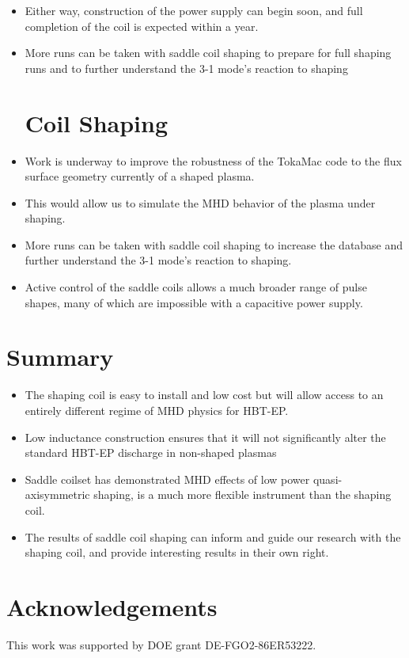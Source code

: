 \documentclass{article}
\begin{document}
\begin{multicols}{5}
\begin{itemize}
\item Either way, construction of the power supply can begin soon, and full completion of the coil is expected within a year.

\item More runs can be taken with saddle coil shaping to prepare for full shaping runs and to further understand the 3-1 mode's reaction to shaping

\section*{Coil Shaping}

\item Work is underway to improve the robustness of the TokaMac code to the flux surface geometry currently of a shaped plasma.  

\item This would allow us to simulate the MHD behavior of the plasma under shaping.

\item More runs can be taken with saddle coil shaping to increase the database and further understand the 3-1 mode's reaction to shaping.

\item Active control of the saddle coils allows a much broader range of pulse shapes, many of which are impossible with a capacitive power supply.  

\end{itemize}


\section{Summary}
\label{sec:summary}

\begin{itemize}
\item The shaping coil is easy to install and low cost but will allow access to an entirely different regime of MHD physics for HBT-EP.  
\item Low inductance construction ensures that it will not significantly alter the standard HBT-EP discharge in non-shaped plasmas
\item Saddle coilset has demonstrated MHD effects of low power quasi-axisymmetric shaping, is a much more flexible instrument than the shaping coil.  
\item The results of saddle coil shaping can inform and guide our research with the shaping coil, and provide interesting results in their own right.
\end{itemize}

\section{Acknowledgements}

This work was supported by DOE grant DE-FGO2-86ER53222.



\end{multicols}
\end{document}
